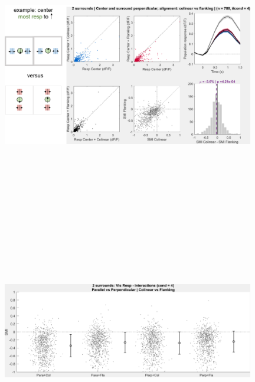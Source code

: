 \begin{figure}[H] \centering \includegraphics[width=11cm,height=11cm,keepaspectratio]{Figures/7.Results/population/sel/diagrams/12.png} 
\end{figure}

\begin{figure}[H] \centering \includegraphics[width=11cm,height=11cm,keepaspectratio]{Figures/7.Results/population/sel/26_popPlots_VisROIs_Cor_2SalignmentAngle.png} 
\end{figure}


